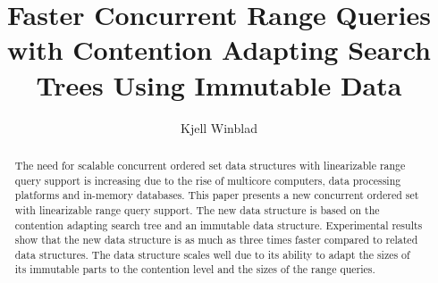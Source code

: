 \documentclass[a4paper,UKenglish]{oasics}
\title{Faster Concurrent Range Queries with Contention Adapting Search Trees Using Immutable Data}%
\author[1]{Kjell Winblad}
\affil[1]{Department of Information Technology, Uppsala University, Sweden\\
  \texttt{kjell.winblad@it.uu.se}}
\begin{document}
 
\maketitle



\begin{abstract}
  The need for scalable concurrent ordered set data structures with linearizable range query support is increasing due to the rise of multicore computers, data processing platforms and in-memory databases.
  This paper presents a new concurrent ordered set with linearizable range query support.
  The new data structure is based on the contention adapting search tree and an immutable data structure.
  Experimental results show that the new data structure is as much as three times faster compared to related data structures.
  The data structure scales well due to its ability to adapt the sizes of its immutable parts to the contention level and the sizes of the range queries.
\end{abstract} 
\end{document}
